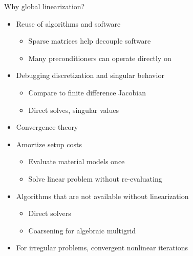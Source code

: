 \begin{frame}{Why global linearization?}
  \begin{itemize}
  \item Reuse of algorithms and software
    \begin{itemize}
    \item Sparse matrices help decouple software
    \item Many preconditioners can operate directly on 
    \end{itemize}
  \item Debugging discretization and singular behavior
    \begin{itemize}
    \item Compare to finite difference Jacobian
    \item Direct solves, singular values
    \end{itemize}
  \item Convergence theory
  \item Amortize setup costs
    \begin{itemize}
    \item Evaluate material models once
    \item Solve linear problem without re-evaluating
    \end{itemize}
  \item Algorithms that are not available without linearization
    \begin{itemize}
    \item Direct solvers
    \item Coarsening for algebraic multigrid
    \end{itemize}
  \item For irregular problems, convergent nonlinear iterations 
  \end{itemize}
\end{frame}
